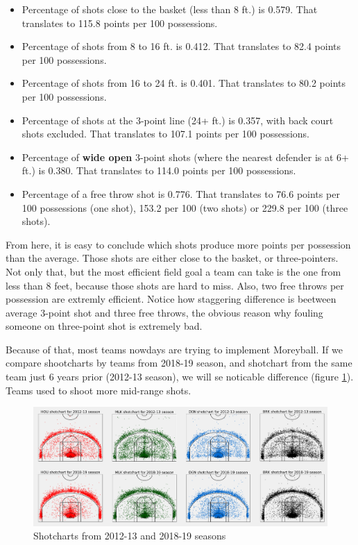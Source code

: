 \documentclass[a4paper]{article}
\begin{document}
\begin{itemize}
	\item Percentage of shots close to the basket (less than 8 ft.) is 0.579. That translates to 115.8 points per 100 possessions.
	\item Percentage of shots from 8 to 16 ft. is 0.412. That translates to 82.4 points per 100 possessions.
	\item Percentage of shots from 16 to 24 ft. is 0.401. That translates to 80.2 points per 100 possessions.
	\item Percentage of shots at the 3-point line (24+ ft.) is 0.357, with back court shots excluded. That translates to 107.1 points per 100 possessions.
	\item Percentage of \textbf{wide open} 3-point shots (where the nearest defender is at 6+ ft.) is 0.380. That translates to 114.0 points per 100 possessions.
	\item Percentage of a free throw shot is 0.776. That translates to 76.6 points per 100 possessions (one shot), 153.2 per 100 (two shots) or 229.8 per 100 (three shots).
\end{itemize}

From here, it is easy to conclude which shots produce more points per possession than the average. Those shots are either close to the basket, or three-pointers. Not only that, but the most efficient field goal a team can take is the one from less than 8 feet, because those shots are hard to miss. Also, two free throws per possession are extremly efficient. Notice how staggering difference is beetween average 3-point shot and three free throws, the obvious reason why fouling someone on three-point shot is extremely bad.

Because of that, most teams nowdays are trying to implement Moreyball. If we compare shootcharts by teams from 2018-19 season, and shotchart from the same team just 6 years prior (2012-13 season), we will se noticable difference (figure \ref{plt:shotcharts}). Teams used to shoot more mid-range shots.

\begin{figure}[h!]
\begin{center}
\includegraphics[scale=0.27]{shotcharts.png}
\end{center}
\caption{Shotcharts from 2012-13 and 2018-19 seasons}
\label{plt:shotcharts}
\end{figure}
\end{document}

